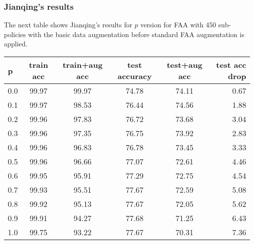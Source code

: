 \subsubsection{Jianqing's results}
The next table shows Jianqing's results for $p$ version for FAA with 450 sub-policies with 
the basic data augmentation before standard FAA augmentation is applied.
\begin{table}[!htbp]
\centering
\begin{tabular}{| l | c | c | c | c | r |}
	\hline
	p          & train acc & train+aug acc & test accuracy  &  test+aug acc & test acc drop\\
	\hline
	0.0          &  99.97   & 99.97       &  74.78         &   74.11            &   0.67  \\
	\hline
	0.1          &  99.97   & 98.53       &  76.44         &   74.56            &   1.88  \\
	\hline
	0.2          &  99.96   & 97.83       &  76.72         &   73.68            &   3.04  \\
	\hline
	0.3          &  99.96   & 97.35       &  76.75         &   73.92            &   2.83  \\
	\hline
	0.4          &  99.96   & 96.83       &  76.78         &   73.45            &   3.33  \\
	\hline
	0.5          &  99.96   & 96.66       &  77.07         &   72.61            &   4.46  \\
	\hline
	0.6          &  99.95   & 95.91       &  77.29         &   72.75            &   4.54  \\
	\hline
	0.7          &  99.93   & 95.51       &  77.67         &   72.59            &   5.08  \\
	\hline
	0.8          &  99.92   & 95.13       &  77.67         &   72.05            &   5.62  \\
	\hline
	0.9          &  99.91   & 94.27       &  77.68         &   71.25            &   6.43  \\
	\hline
	1.0          &  99.75   & 93.22       &  77.67         &   70.31            &   7.36  \\
	\hline
\end{tabular}
\end{table}
